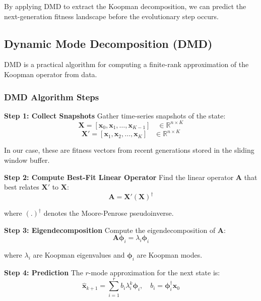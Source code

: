 \documentclass[12pt,a4paper]{article}
\begin{document}
By applying DMD to extract the Koopman decomposition, we can predict the next-generation fitness landscape before the evolutionary step occurs.

\subsection{Dynamic Mode Decomposition (DMD)}

DMD is a practical algorithm for computing a finite-rank approximation of the Koopman operator from data.

\subsubsection{DMD Algorithm Steps}

\textbf{Step 1: Collect Snapshots}
Gather time-series snapshots of the state:
\begin{equation}
\mathbf{X} = [\mathbf{x}_0, \mathbf{x}_1, \ldots, \mathbf{x}_{K-1}] \quad \in \mathbb{R}^{n \times K}
\end{equation}
\begin{equation}
\mathbf{X}' = [\mathbf{x}_1, \mathbf{x}_2, \ldots, \mathbf{x}_K] \quad \in \mathbb{R}^{n \times K}
\end{equation}

In our case, these are fitness vectors from recent generations stored in the sliding window buffer.

\textbf{Step 2: Compute Best-Fit Linear Operator}
Find the linear operator $\mathbf{A}$ that best relates $\mathbf{X}'$ to $\mathbf{X}$:
\begin{equation}
\mathbf{A} = \mathbf{X}' (\mathbf{X})^\dagger
\end{equation}

where $(.)^\dagger$ denotes the Moore-Penrose pseudoinverse.

\textbf{Step 3: Eigendecomposition}
Compute the eigendecomposition of $\mathbf{A}$:
\begin{equation}
\mathbf{A} \boldsymbol{\phi}_i = \lambda_i \boldsymbol{\phi}_i
\end{equation}

where $\lambda_i$ are Koopman eigenvalues and $\boldsymbol{\phi}_i$ are Koopman modes.

\textbf{Step 4: Prediction}
The $r$-mode approximation for the next state is:
\begin{equation}
\hat{\mathbf{x}}_{k+1} = \sum_{i=1}^{r} b_i \lambda_i^k \boldsymbol{\phi}_i, \quad b_i = \boldsymbol{\phi}_i^\dagger \mathbf{x}_0
\end{equation}
\end{document}
